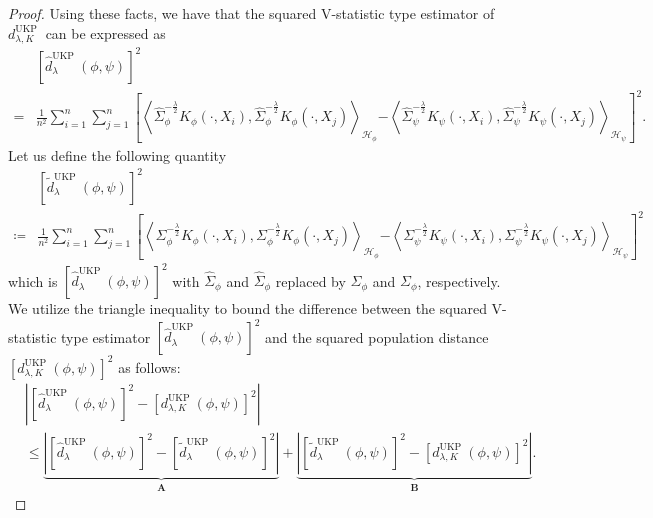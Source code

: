 \documentclass{article} %
\newcommand{\repone}{\phi}
\newcommand{\reptwo}{\psi}
\newcommand{\Hone}{\mathcal{H}_{\phi}}
\newcommand{\Htwo}{\mathcal{H}_{\psi}}
\newcommand{\inprod}[1]{\left \langle #1 \right\rangle}
\newcommand{\metricstname}{UKP }
\theoremstyle{plain}
\begin{document}
\begin{proof}
    Using these facts, we have that the squared V-statistic type estimator of $d_{\lambda,K}^{\text{\metricstname}}$ can be expressed as
    \[
    \begin{aligned}
&\left[\hat{d}_{\lambda}^{\text{\metricstname}}(\repone,\reptwo)\right]^{2}\\
        =&\frac{1}{n^{2}}\sum_{i=1}^{n}\sum_{j=1}^{n}\left[\inprod{\hat{\Sigma}_{\repone}^{-\frac{\lambda}{2}}K_{\repone}(\cdot,X_{i}),\hat{\Sigma}_{\repone}^{-\frac{\lambda}{2}}K_{\repone}(\cdot,X_{j})}_{\Hone}\right.\left.-\inprod{\hat{\Sigma}_{\reptwo}^{-\frac{\lambda}{2}}K_{\reptwo}(\cdot,X_{i}),\hat{\Sigma}_{\reptwo}^{-\frac{\lambda}{2}}K_{\reptwo}(\cdot,X_{j})}_{\Htwo}\right]^{2}.
    \end{aligned}
    \]
Let us define the following quantity
\[
\begin{aligned}
    &\left[\tilde{d}_{\lambda}^{\text{\metricstname}}(\repone,\reptwo)\right]^{2}\\
    \coloneq&\frac{1}{n^{2}}\sum_{i=1}^{n}\sum_{j=1}^{n}\left[\inprod{\Sigma_{\repone}^{-\frac{\lambda}{2}}K_{\repone}(\cdot,X_{i}),\Sigma_{\repone}^{-\frac{\lambda}{2}}K_{\repone}(\cdot,X_{j})}_{\Hone}\right.\left.-\inprod{\Sigma_{\reptwo}^{-\frac{\lambda}{2}}K_{\reptwo}(\cdot,X_{i}),\Sigma_{\reptwo}^{-\frac{\lambda}{2}}K_{\reptwo}(\cdot,X_{j})}_{\Htwo}\right]^{2} 
\end{aligned}
\]
which is $\left[\hat{d}_{\lambda}^{\text{\metricstname}}(\repone,\reptwo)\right]^{2}$ with $\hat{\Sigma}_{\repone}$ and $\hat{\Sigma}_{\repone}$ replaced by $\Sigma_{\repone}$ and $\Sigma_{\repone}$, respectively. We utilize the triangle inequality to bound the difference between the squared V-statistic type estimator $\left[\hat{d}_{\lambda}^{\text{\metricstname}}(\repone,\reptwo)\right]^{2}$ and the squared population distance $\left[d_{\lambda,K}^{\text{\metricstname}}(\repone,\reptwo)\right]^{2}$ as follows:
\begin{equation}\label{Triangle inequality for concentration result}
    \begin{aligned}
        &\left|\left[\hat{d}_{\lambda}^{\text{\metricstname}}(\repone,\reptwo)\right]^{2} - \left[d_{\lambda,K}^{\text{\metricstname}}(\repone,\reptwo)\right]^{2}\right|\\
        &\leq \underbrace{\left|\left[\hat{d}_{\lambda}^{\text{\metricstname}}(\repone,\reptwo)\right]^{2} - \left[\tilde{d}_{\lambda}^{\text{\metricstname}}(\repone,\reptwo)\right]^{2}\right|}_{\mathbf{A}} +\underbrace{\left|\left[\tilde{d}_{\lambda}^{\text{\metricstname}}(\repone,\reptwo)\right]^{2} - \left[d_{\lambda,K}^{\text{\metricstname}}(\repone,\reptwo)\right]^{2}\right|}_{\mathbf{B}}.
    \end{aligned}
\end{equation}


\end{proof}
\end{document}
